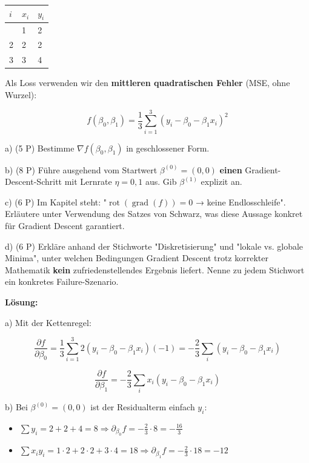 \documentclass[11pt, a4paper]{article}
\begin{document}
{\small
\begin{tabularx}{\linewidth}{XXX}
\hline
\rowcolor{tableheadbg}
{\color{white}\textbf{$i$}} & {\color{white}\textbf{$x_i$}} & {\color{white}\textbf{$y_i$}} \\[2pt]
\hline
\endhead
\hline
\endfoot
1 & 1 & 2 \\
2 & 2 & 2 \\
3 & 3 & 4 \\
\end{tabularx}
}


Als Loss verwenden wir den \textbf{mittleren quadratischen Fehler} (MSE, ohne Wurzel):

\[
f(\beta_0, \beta_1) = \frac{1}{3}\sum_{i=1}^{3}(y_i - \beta_0 - \beta_1 x_i)^2
\]


a) (5 P) Bestimme $\nabla f(\beta_0, \beta_1)$ in geschlossener Form.


b) (8 P) Führe ausgehend vom Startwert $\beta^{(0)} = (0, 0)$ \textbf{einen} Gradient-Descent-Schritt mit Lernrate $\eta = 0{,}1$ aus. Gib $\beta^{(1)}$ explizit an.


c) (6 P) Im Kapitel steht: "$\operatorname{rot}(\operatorname{grad}(f)) = 0$ → keine Endlosschleife". Erläutere unter Verwendung des Satzes von Schwarz, was diese Aussage konkret für Gradient Descent garantiert.


d) (6 P) Erkläre anhand der Stichworte "Diskretisierung" und "lokale vs. globale Minima", unter welchen Bedingungen Gradient Descent trotz korrekter Mathematik \textbf{kein} zufriedenstellendes Ergebnis liefert. Nenne zu jedem Stichwort ein konkretes Failure-Szenario.


\textbf{Lösung:}


a) Mit der Kettenregel:

\[
\frac{\partial f}{\partial \beta_0} = \frac{1}{3}\sum_{i=1}^{3} 2(y_i - \beta_0 - \beta_1 x_i)(-1) = -\frac{2}{3}\sum_{i}(y_i - \beta_0 - \beta_1 x_i)
\]

\[
\frac{\partial f}{\partial \beta_1} = -\frac{2}{3}\sum_{i} x_i(y_i - \beta_0 - \beta_1 x_i)
\]


b) Bei $\beta^{(0)}=(0,0)$ ist der Residualterm einfach $y_i$:


\begin{itemize}
  \item $\sum y_i = 2+2+4 = 8 \Rightarrow \partial_{\beta_0} f = -\frac{2}{3}\cdot 8 = -\frac{16}{3}$
  \item $\sum x_i y_i = 1\cdot 2 + 2\cdot 2 + 3\cdot 4 = 18 \Rightarrow \partial_{\beta_1} f = -\frac{2}{3}\cdot 18 = -12$
\end{itemize}
\end{document}
